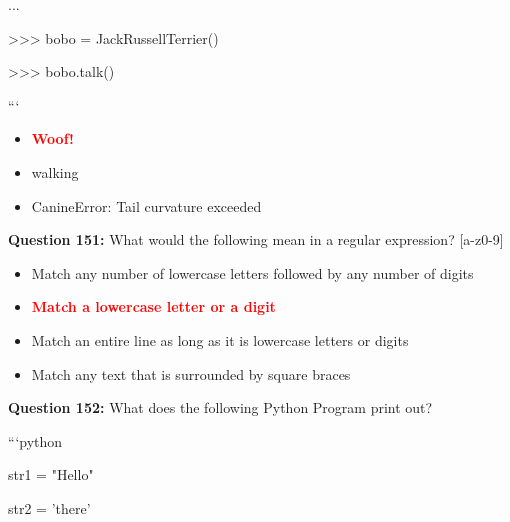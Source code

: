 \documentclass[12pt,a4paper]{article}
\begin{document}
\newline
...\newline

\newline
>>> bobo = JackRussellTerrier()\newline

\newline
>>> bobo.talk()\newline

\newline
```

\begin{itemize}
    \item[\textbf{A.}] \textcolor{red}{\textbf{Woof!}}
    \item[\textbf{B.}] walking
    \item[\textbf{C.}] CanineError: Tail curvature exceeded
\end{itemize}

\vspace{0.5cm}

\textbf{Question 151:} What would the following mean in a regular expression? [a-z0-9]

\begin{itemize}
    \item[\textbf{A.}] Match any number of lowercase letters followed by any number of digits
    \item[\textbf{B.}] \textcolor{red}{\textbf{Match a lowercase letter or a digit}}
    \item[\textbf{C.}] Match an entire line as long as it is lowercase letters or digits
    \item[\textbf{D.}] Match any text that is surrounded by square braces
\end{itemize}

\vspace{0.5cm}

\textbf{Question 152:} What does the following Python Program print out?\newline

\newline
\newline

\newline
```python\newline

\newline
str1 = "Hello"\newline

\newline
str2 = 'there'\newline
\end{document}

